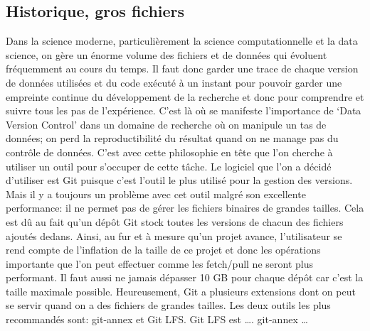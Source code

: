 \documentclass[11pt]{article}
\begin{document}
\subsection{Historique, gros fichiers}
\label{sec:org411a5fb}
Dans la science moderne, particulièrement la science computationnelle
et la data science, on gère un énorme volume des fichiers et de
données qui évoluent fréquemment au cours du temps. Il faut donc
garder une trace de chaque version de données utilisées et du code
exécuté à un instant pour pouvoir garder une empreinte continue du
développement de la recherche et donc pour comprendre et suivre tous
les pas de l'expérience. C’est là où se manifeste l’importance de
‘Data Version Control’ dans un domaine de recherche où on manipule un
tas de données; on perd la reproductibilité du résultat quand on ne
manage pas du contrôle de données. C’est avec cette philosophie en
tête que l’on cherche à utiliser un outil pour s’occuper de cette
tâche.  Le logiciel que l’on a décidé d’utiliser est Git puisque c’est
l’outil le plus utilisé pour la gestion des versions. Mais il y a
toujours un problème avec cet outil malgré son excellente performance:
il ne permet pas de gérer les fichiers binaires de grandes
tailles. Cela est dû au fait qu’un dépôt Git stock toutes les versions
de chacun des fichiers ajoutés dedans. Ainsi, au fur et à mesure qu’un
projet avance, l’utilisateur se rend compte de l’inflation de la
taille de ce projet  et donc les opérations importante que l’on peut
effectuer comme les fetch/pull ne seront plus performant. Il faut
aussi ne jamais dépasser 10 GB pour chaque dépôt car c’est la taille
maximale possible. Heureusement, Git a plusieurs extensions dont on
peut se servir quand on a des fichiers de grandes tailles. Les deux
outils les plus recommandés sont: git-annex et Git LFS.
Git LFS est ….
git-annex \ldots{}
\end{document}
